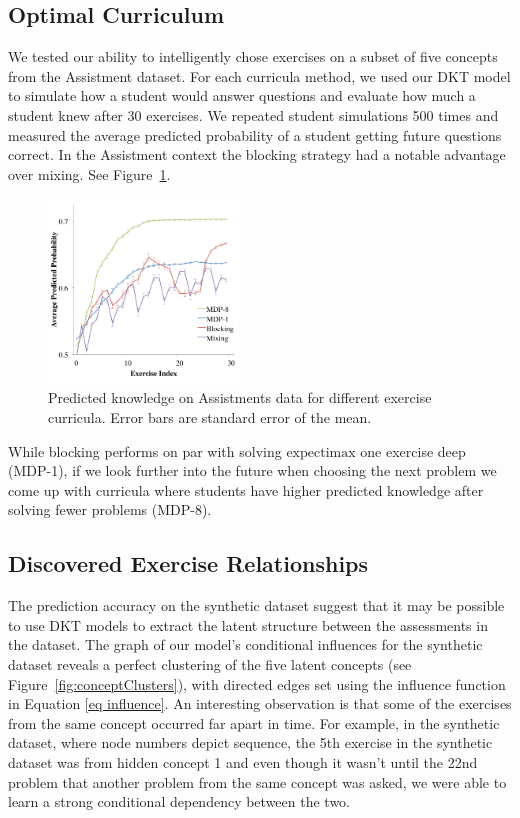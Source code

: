  \subsection{Optimal Curriculum}
We tested our ability to intelligently chose exercises on a subset of five concepts from the Assistment dataset. For each curricula method, we used our DKT model to simulate how a student would answer questions and evaluate how much a student knew after 30 exercises. We repeated student simulations 500 times and measured the average predicted probability of a student getting future questions correct. In the Assistment context the blocking strategy had a notable advantage over mixing. See Figure~\ref{fig:curriculum}. 

\begin{figure}[h]
 \centering
 \includegraphics[width=0.45\textwidth]{img/curriculum}
 \caption[Curriculum evaluation]{Predicted knowledge on Assistments data for different exercise curricula. Error bars are standard error of the mean.}
 \label{fig:curriculum}
\end{figure}

While blocking performs on par with solving $\mathrm{expectimax}$ one exercise deep (MDP-1), if we look further into the future when choosing the next problem we come up with curricula where students have higher predicted knowledge after solving fewer problems (MDP-8). 


\subsection{Discovered Exercise Relationships}\label{sec ex rel}



The prediction accuracy on the synthetic dataset suggest that it may be possible to use DKT models to extract the latent structure between the assessments in the dataset. The graph of our model's conditional influences for the synthetic dataset reveals a perfect clustering of the five latent concepts (see Figure~\ref{fig:conceptClusters}),
with directed edges set using the influence function in Equation \ref{eq influence}.
An interesting observation is that some of the exercises from the same concept occurred far apart in time. For example, in the synthetic dataset, where node numbers depict sequence, the 5th exercise in the synthetic dataset was from hidden concept 1 and even though it wasn't until the 22nd problem that another problem from the same concept was asked, we were able to learn a strong conditional dependency between the two.

